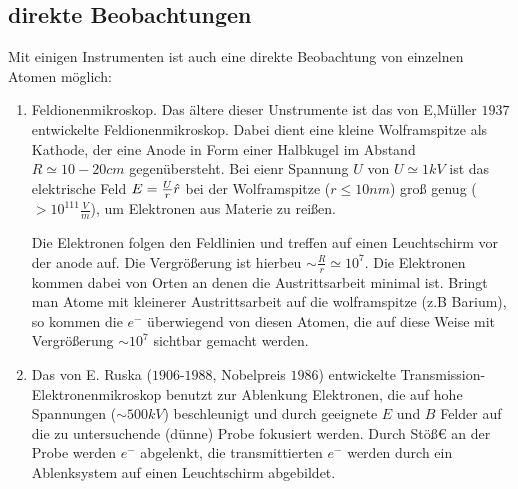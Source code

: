 \subsection{direkte Beobachtungen} %
\label{sub:direkte_Beobachtungen}
Mit einigen Instrumenten ist auch eine direkte Beobachtung von einzelnen Atomen
möglich:
\begin{enumerate}
    \item{Feldionenmikroskop.}
    Das ältere dieser Unstrumente ist das von E,Müller $1937$ entwickelte
    Feldionenmikroskop. Dabei dient eine kleine Wolframspitze als Kathode, der
    eine Anode in Form einer Halbkugel im Abstand $R \simeq 10-20cm$
    gegenübersteht. Bei eienr Spannung $U$ von $U \simeq 1kV$ ist das
    elektrische Feld $E = \frac{U}{r} \hat{r}$ bei der Wolframspitze ($r \leq
    10nm$) groß genug ($ > 10^{111} \frac{V}{m}$), um Elektronen aus Materie zu
    reißen.

    Die Elektronen folgen den Feldlinien und treffen auf einen Leuchtschirm vor
    der anode auf. Die Vergrößerung ist hierbeu $\sim \frac{R}{r} \simeq 10^7$.
    Die Elektronen kommen dabei von Orten an denen die Austrittsarbeit minimal
    ist. Bringt man Atome mit kleinerer Austrittsarbeit auf die wolframspitze
    (z.B Barium), so kommen die $e^-$ überwiegend von diesen Atomen, die auf
    diese Weise mit Vergrößerung $\sim 10^7$ sichtbar gemacht werden.
    \item Das von E. Ruska ($1906$-$1988$, Nobelpreis $1986$) entwickelte
    Transmission-Elektronenmikroskop benutzt zur Ablenkung Elektronen, die auf hohe
    Spannungen ($\sim 500kV$) beschleunigt und durch geeignete $E$ und $B$
    Felder auf die  zu untersuchende (dünne) Probe fokusiert werden. Durch
    Stöß€ an der Probe werden $e^-$ abgelenkt, die transmittierten $e^-$ werden
    durch ein Ablenksystem auf einen Leuchtschirm abgebildet.
\end{enumerate}




